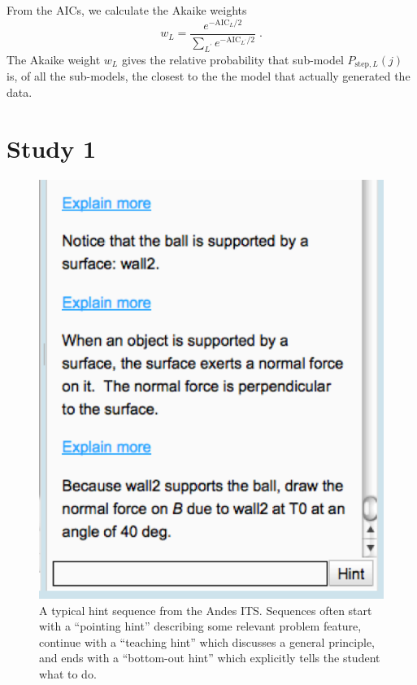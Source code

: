 \documentclass{edm_template}
\begin{document}
From the AICs, we calculate 
the Akaike weights
%
\begin{equation}
     w_L=\frac{e^{-\mathrm{AIC}_L/2} }{\sum_{L^\prime}
       e^{-\mathrm{AIC}_{L^\prime}/2}} \; .
\end{equation}
%
The Akaike weight $w_L$ gives the relative probability that sub-model 
$P_{\mathrm{step},L}(j)$ is, of all the sub-models, the closest to the 
the model that actually generated the data.

\section{Study 1}

\begin{figure}
\centering    \includegraphics[scale=0.5]{andes-hint-sequence.png}
  \caption{A typical hint sequence from the Andes ITS. Sequences
    often start with a ``pointing hint'' describing some relevant problem
    feature, continue with a ``teaching hint'' which discusses a general principle,
    and ends with a ``bottom-out hint'' which explicitly tells the student
    what to do.}
         \label{hint-sequence}
\end{figure}
\end{document}
